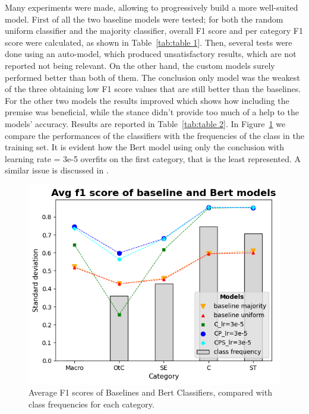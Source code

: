 \documentclass[11pt]{article}
\begin{document}
Many experiments were made, allowing to progressively build a more well-suited model. First of all the two baseline models were tested; for both the random uniform classifier and the majority classifier, overall F1 score and per category F1 score were calculated, as shown in Table~\ref{tab:table 1}. Then, several tests were done using an auto-model, which produced unsatisfactory results, which are not reported not being relevant. On the other hand, the custom models surely performed better than both of them. The conclusion only model was the weakest of the three obtaining low F1 score values that are still better than the baselines. For the other two models the results improved which shows how including the premise was beneficial, while the stance didn't provide too much of a help to the models' accuracy. Results are reported in Table~\ref{tab:table 2}. In Figure~\ref{fig:graph} we compare the performances of the classifiers with the frequencies of the class in the training set. It is evident how the Bert model using only the conclusion with learning rate = 3e-5 overfits on the first category, that is the least represented. A similar issue is discussed in \cite{kiesel-etal-2022-identifying}. 

\begin{figure}
    \includegraphics[scale=0.55]{img/output.png}
    \caption{Average F1 scores of Baselines and Bert Classifiers, compared with class frequencies for each category.}
    \label{fig:graph}
\end{figure}
\end{document}

